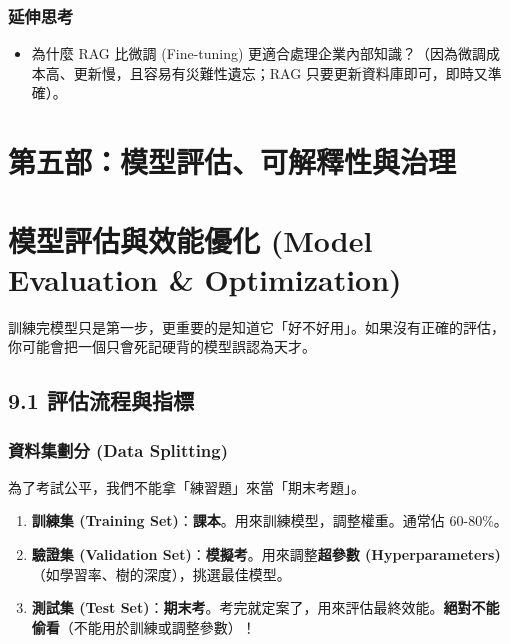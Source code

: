 \documentclass[
  letterpaper,
  DIV=11,
  numbers=noendperiod]{scrreprt}
\providecommand{\tightlist}{%
  \setlength{\itemsep}{0pt}\setlength{\parskip}{0pt}}
\begin{document}
\section{延伸思考}\label{ux5ef6ux4f38ux601dux8003-7}

\begin{itemize}
\tightlist
\item
  為什麼 RAG 比微調 (Fine-tuning)
  更適合處理企業內部知識？（因為微調成本高、更新慢，且容易有災難性遺忘；RAG
  只要更新資料庫即可，即時又準確）。
\end{itemize}

\part{第五部：模型評估、可解釋性與治理}

\part{模型評估與效能優化 (Model Evaluation \&
Optimization)}\label{ux6a21ux578bux8a55ux4f30ux8207ux6548ux80fdux512aux5316-model-evaluation-optimization}

訓練完模型只是第一步，更重要的是知道它「好不好用」。如果沒有正確的評估，你可能會把一個只會死記硬背的模型誤認為天才。

\chapter{9.1 評估流程與指標}\label{sec-evaluation-metrics}

\section{資料集劃分 (Data Splitting)}\label{sec-data-split}

為了考試公平，我們不能拿「練習題」來當「期末考題」。

\begin{enumerate}
\def\labelenumi{\arabic{enumi}.}
\tightlist
\item
  \textbf{訓練集 (Training
  Set)}：\textbf{課本}。用來訓練模型，調整權重。通常佔 60-80\%。
\item
  \textbf{驗證集 (Validation
  Set)}：\textbf{模擬考}。用來調整\textbf{超參數
  (Hyperparameters)}（如學習率、樹的深度），挑選最佳模型。
\item
  \textbf{測試集 (Test
  Set)}：\textbf{期末考}。考完就定案了，用來評估最終效能。\textbf{絕對不能偷看}（不能用於訓練或調整參數）！
\end{enumerate}
\end{document}
